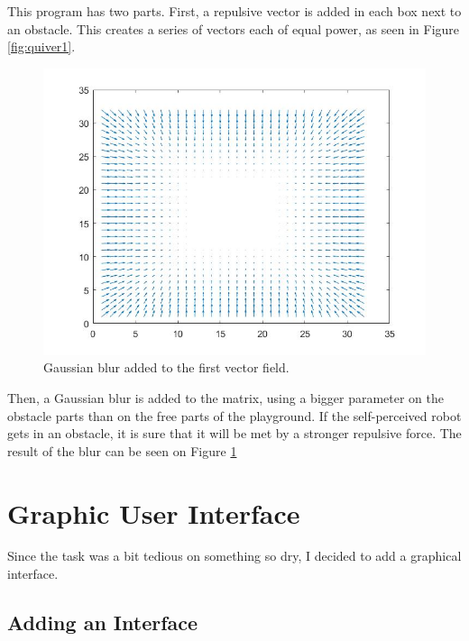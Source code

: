  This program has two parts. First, a repulsive vector is added in each box next to an obstacle.
 This creates a series of vectors each of equal power, as seen in Figure \ref{fig:quiver1}.\\

 \begin{figure}[H]
 \centering
 \includegraphics[scale=0.4]{Figures/quiver2}
 \decoRule
 \caption[Blurred Quiver]{Gaussian blur added to the first vector field.}
 \label{fig:quiver2}
 \end{figure}

Then, a Gaussian blur is added to the matrix, using a bigger parameter on the obstacle parts than on the free parts of the playground.
If the self-perceived robot gets in an obstacle, it is sure that it will be met by a stronger repulsive force.
 The result of the blur can be seen on Figure \ref{fig:quiver2}\\



%

\section{Graphic User Interface}

Since the task was a bit tedious on something so dry, I decided to add a graphical interface.

\subsection{Adding an Interface}

